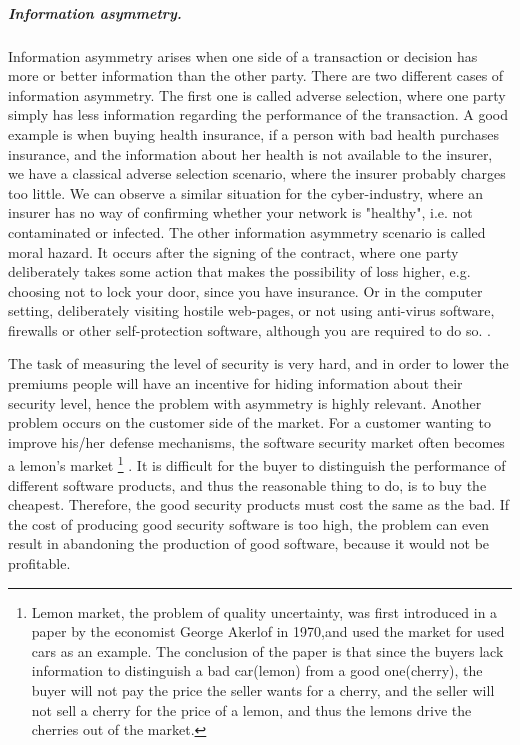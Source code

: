 \subparagraph{Information asymmetry.}
Information asymmetry arises when one side of a transaction or decision has more or better information than the other party. There are two different cases of information asymmetry. The first one is called adverse selection, where one party simply has less information regarding the performance of the transaction. A good example is when buying health insurance, if a person with bad health purchases insurance, and the information about her health is not available to the insurer, we have a classical adverse selection scenario, where the insurer probably charges too little. We can observe a similar situation for the cyber-industry, where an insurer has no way of confirming whether your network is "healthy", i.e. not contaminated or infected. 
The other information asymmetry scenario is called moral hazard. It occurs after the signing of the contract, where one party deliberately takes some action that makes the possibility of loss higher, e.g. choosing not to lock your door, since you have insurance. Or in the computer setting, deliberately visiting hostile web-pages, or not using anti-virus software, firewalls or other self-protection software, although you are required to do so. \cite{solutiontoinfoasym}.
    
    
The task of measuring the level of security is very hard, and in order to lower the premiums people will have an incentive for hiding information about their security level, hence the problem with asymmetry is highly relevant. Another problem occurs on the customer side of the market. For a customer wanting to improve his/her defense mechanisms, the software security market often becomes a lemon's market
\footnote{Lemon market, the problem of quality uncertainty, was first introduced in a paper \cite{lemonpaper} by the economist George Akerlof in 1970,and used the market for used cars as an example.\cite{lemon} The conclusion of the paper is that since the buyers lack information to distinguish a bad car(lemon) from a good one(cherry), the buyer will not pay the price the seller wants for a cherry, and the seller will not sell a cherry for the price of a lemon, and thus the lemons drive the cherries out of the market.}
. 
It is difficult for the buyer to distinguish the performance of different software products, and thus the reasonable thing to do, is to buy the cheapest. Therefore, the good security products must cost the same as the bad. If the cost of producing good security software is too high, the problem can even result in abandoning the production of good software, because it would not be profitable.

